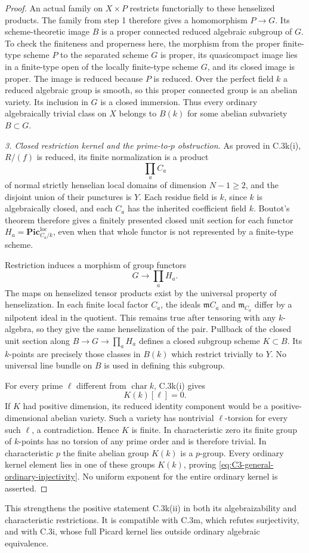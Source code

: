 \begin{proof}
An actual family on $X\times P$ restricts
functorially to these henselized products.
The family from step 1 therefore gives a
homomorphism $P\to G$. Its scheme-theoretic
image $B$ is a proper connected reduced
algebraic subgroup of $G$. To check the
finiteness and properness here, the morphism
from the proper finite-type scheme $P$ to
the separated scheme $G$ is proper, its
quasicompact image lies in a finite-type
open of the locally finite-type scheme $G$,
and its closed image is proper. The image
is reduced because $P$ is reduced. Over
the perfect field $k$ a reduced algebraic
group is smooth, so this proper connected
group is an abelian variety. Its inclusion
in $G$ is a closed immersion.
Thus every ordinary algebraically trivial
class on $X$ belongs to $B(k)$ for some
abelian subvariety $B\subset G$.

\emph{3. Closed restriction kernel and the
prime-to-$p$ obstruction.}
As proved in C.3k(i), $R/(f)$ is reduced,
its finite normalization is a product
\[
                            \prod_a C_a
\]
of normal strictly henselian local domains
of dimension $N-1\ge2$, and the disjoint
union of their punctures is $Y$.
Each residue field is $k$, since $k$ is
algebraically closed, and each $C_a$ has
the inherited coefficient field $k$.
Boutot's theorem therefore gives a finitely
presented closed unit section for each
functor $H_a=\mathbf{Pic}^{\mathrm{loc}}_{C_a/k}$,
even when that whole functor is not
represented by a finite-type scheme.

Restriction induces a morphism of group
functors
\[
                  G\longrightarrow\prod_a H_a.
\]
The maps on henselized tensor products
exist by the universal property of
henselization. In each finite local
factor $C_a$, the ideals
$\mathfrak m C_a$ and $\mathfrak m_{C_a}$
differ by a nilpotent ideal in the
quotient. This remains true after
tensoring with any $k$-algebra, so they
give the same henselization of the pair.
Pullback of the closed
unit section along
$B\to G\to\prod_a H_a$ defines a closed
subgroup scheme $K\subset B$. Its
$k$-points are precisely those classes
in $B(k)$ which restrict trivially to $Y$.
No universal line bundle on $B$ is used
in defining this subgroup.

For every prime $\ell$ different from
$\operatorname{char}k$, C.3k(i) gives
\[
                             K(k)[\ell]=0.
\]
If $K$ had positive dimension, its
reduced identity component would be
a positive-dimensional abelian variety.
Such a variety has nontrivial
$\ell$-torsion for every such $\ell$,
a contradiction. Hence $K$ is finite.
In characteristic zero its finite group
of $k$-points has no torsion of any
prime order and is therefore trivial.
In characteristic $p$ the finite
abelian group $K(k)$ is a $p$-group.
Every ordinary kernel element lies in
one of these groups $K(k)$, proving
\eqref{eq:C3-general-ordinary-injectivity}.
No uniform exponent for the entire
ordinary kernel is asserted.
\end{proof}

This strengthens the positive statement C.3k(ii)
in both its algebraizability and characteristic
restrictions. It is compatible with C.3m, which
refutes surjectivity, and with C.3i, whose full
Picard kernel lies outside ordinary algebraic
equivalence.
